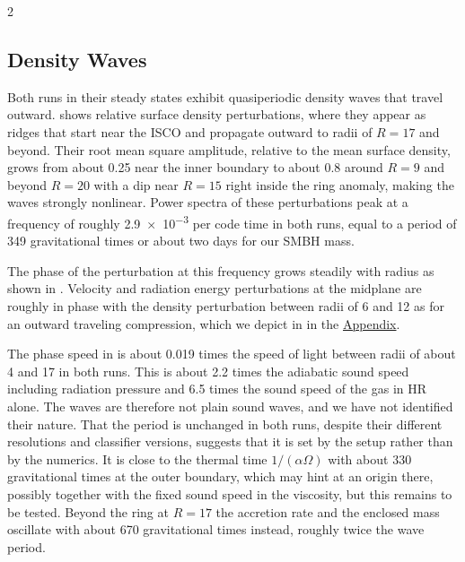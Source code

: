 \begin{multicols}{2}

	\subsection{Density Waves}

	Both runs in their steady states exhibit quasiperiodic density waves that travel outward.  shows relative surface
	density perturbations, where they appear as ridges that start near the ISCO and propagate outward to radii of $R = 17$ and beyond.
	Their root mean square amplitude, relative to the mean surface density, grows from about \num{0.25} near the inner
	boundary to about \num{0.8} around $R = 9$ and beyond $R = 20$ with a dip near $R = 15$ right inside the ring anomaly, making the waves
	strongly nonlinear. Power spectra of these perturbations peak at a frequency of roughly \num{2.9e-3} per code time in both
	runs, equal to a period of \num{349} gravitational times or about two days for our SMBH mass.

	The phase of the perturbation at this frequency grows steadily with radius as shown in . Velocity and radiation energy
	perturbations at the midplane are roughly in phase with the density perturbation between radii of \num{6} and \num{12} as for an
	outward traveling compression, which we depict in  in the \hyperref[sec:appendix]{Appendix}.


	The phase speed in  is about \num{0.019} times the speed of light between radii of about \num{4} and \num{17} in
	both runs. This is about \num{2.2} times the adiabatic sound speed including radiation pressure and \num{6.5} times the sound speed
	of the gas in HR alone. The waves are therefore not plain sound waves, and we have not identified their
	nature. That the period is unchanged in both runs, despite their different resolutions and classifier versions, suggests that
	it is set by the setup rather than by the numerics. It is close to the thermal time $1 / (\alpha \Omega)$ with about \num{330}
	gravitational times at the outer boundary, which may hint at an origin there, possibly together with the fixed sound speed
	in the viscosity, but this remains to be tested. Beyond the ring at $R = 17$ the accretion rate and the enclosed mass
	oscillate with about \num{670} gravitational times instead, roughly twice the wave period.


\end{multicols}
